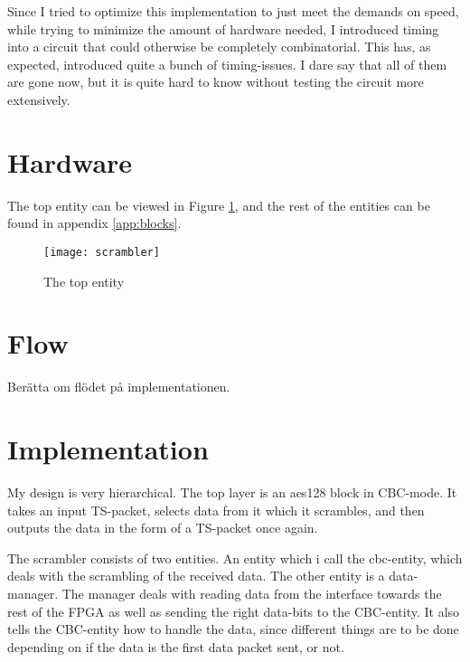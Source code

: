 Since I tried to optimize this implementation to just meet the demands on speed, 
while trying to minimize the amount of hardware needed, I introduced timing into 
a circuit that could otherwise be completely combinatorial. This has, as 
expected, introduced quite a bunch of timing-issues. I dare say that all of them 
are gone now, but it is quite hard to know without testing the circuit more 
extensively.

\section{Hardware}
The top entity can be viewed in Figure \ref{b:scr}, and the rest of the entities 
can be found in appendix \ref{app:blocks}.

\begin{figure}
  \texttt{[image: scrambler]}
  \caption{The top entity}
  \label{b:scr}
\end{figure}



\section{Flow}
Berätta om flödet på implementationen.

\section{Implementation}
My design is very hierarchical. The top layer is an aes128 block in CBC-mode. 
It takes an input TS-packet, selects data from it which it scrambles, and then 
outputs the data in the form of a TS-packet once again.

The scrambler consists of two entities. An entity which i call the cbc-entity, 
which deals with the scrambling of the received data. The other entity is a 
data-manager. The manager deals with reading data from the interface towards the 
rest of the FPGA as well as sending the right data-bits to the CBC-entity. It 
also tells the CBC-entity how to handle the data, since different things are to 
be done depending on if the data is the first data packet sent, or not.

